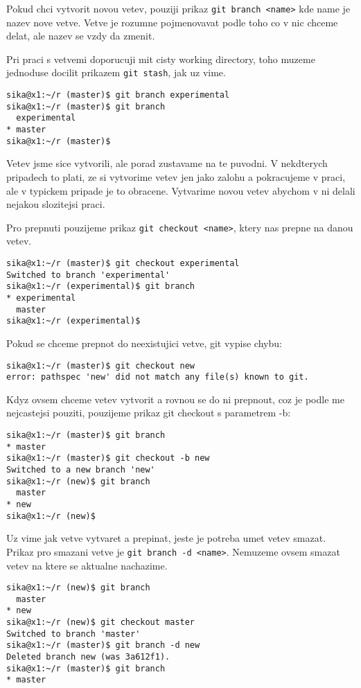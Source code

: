 \documentclass[12pt,a5paper]{article}
\begin{document}
Pokud chci vytvorit novou vetev, pouziji prikaz \lstinline|git branch <name>| kde name je nazev nove vetve. Vetve je rozumne pojmenovavat podle toho co v nic chceme delat, ale nazev se vzdy da zmenit.

Pri praci s vetvemi doporucuji mit cisty working directory, toho muzeme jednoduse docilit prikazem \lstinline|git stash|, jak uz vime.

\begin{lstlisting}
sika@x1:~/r (master)$ git branch experimental
sika@x1:~/r (master)$ git branch
  experimental
* master
sika@x1:~/r (master)$
\end{lstlisting}

Vetev jsme sice vytvorili, ale porad zustavame na te puvodni. V nekdterych pripadech to plati, ze si vytvorime vetev jen jako zalohu a pokracujeme v praci, ale v typickem pripade je to obracene. Vytvarime novou vetev abychom v ni delali nejakou slozitejsi praci.

Pro prepnuti pouzijeme prikaz \lstinline|git checkout <name>|, ktery nas prepne na danou vetev.

\begin{lstlisting}
sika@x1:~/r (master)$ git checkout experimental
Switched to branch 'experimental'
sika@x1:~/r (experimental)$ git branch
* experimental
  master
sika@x1:~/r (experimental)$
\end{lstlisting}

Pokud se chceme prepnot do neexistujici vetve, git vypise chybu:

\begin{lstlisting}
sika@x1:~/r (master)$ git checkout new
error: pathspec 'new' did not match any file(s) known to git.
\end{lstlisting}

Kdyz ovsem chceme vetev vytvorit a rovnou se do ni prepnout, coz je podle me nejcastejsi pouziti, pouzijeme prikaz git checkout s parametrem -b:

\begin{lstlisting}
sika@x1:~/r (master)$ git branch
* master
sika@x1:~/r (master)$ git checkout -b new
Switched to a new branch 'new'
sika@x1:~/r (new)$ git branch
  master
* new
sika@x1:~/r (new)$
\end{lstlisting}

Uz vime jak vetve vytvaret a prepinat, jeste je potreba umet vetev smazat. Prikaz pro smazani vetve je \lstinline|git branch -d <name>|. Nemuzeme ovsem smazat vetev na ktere se aktualne nachazime.

\begin{lstlisting}
sika@x1:~/r (new)$ git branch
  master
* new
sika@x1:~/r (new)$ git checkout master
Switched to branch 'master'
sika@x1:~/r (master)$ git branch -d new
Deleted branch new (was 3a612f1).
sika@x1:~/r (master)$ git branch
* master
\end{lstlisting}
\end{document}
